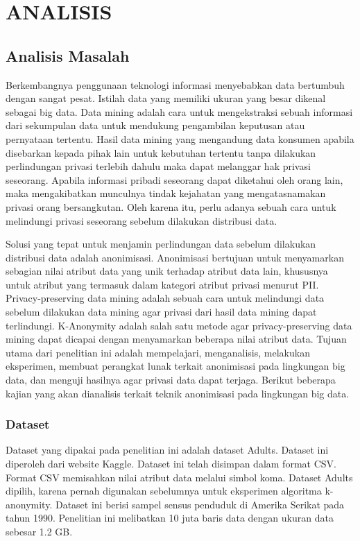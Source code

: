 \chapter{ANALISIS}
\section{Analisis Masalah}
Berkembangnya penggunaan teknologi informasi menyebabkan data bertumbuh dengan sangat pesat. Istilah data yang memiliki ukuran yang besar dikenal sebagai big data. Data mining adalah cara untuk mengekstraksi sebuah informasi dari sekumpulan data untuk mendukung pengambilan keputusan atau pernyataan tertentu. Hasil data mining yang mengandung data konsumen apabila disebarkan kepada pihak lain untuk kebutuhan tertentu tanpa dilakukan perlindungan privasi terlebih dahulu maka dapat melanggar hak privasi seseorang. Apabila informasi pribadi seseorang dapat diketahui oleh orang lain, maka mengakibatkan munculnya tindak kejahatan yang mengatasnamakan privasi orang bersangkutan. Oleh karena itu, perlu adanya sebuah cara untuk melindungi privasi seseorang sebelum dilakukan distribusi data.

\par Solusi yang tepat untuk menjamin perlindungan data sebelum dilakukan distribusi data adalah anonimisasi. Anonimisasi bertujuan untuk menyamarkan sebagian nilai atribut data yang unik terhadap atribut data lain, khususnya untuk atribut yang termasuk dalam kategori atribut privasi menurut PII. Privacy-preserving data mining adalah sebuah cara untuk melindungi data sebelum dilakukan data mining agar privasi dari hasil data mining dapat terlindungi. K-Anonymity adalah salah satu metode agar privacy-preserving data mining dapat dicapai dengan menyamarkan beberapa nilai atribut data. Tujuan utama dari penelitian ini adalah mempelajari, menganalisis, melakukan eksperimen, membuat perangkat lunak terkait anonimisasi pada lingkungan big data, dan menguji hasilnya agar privasi data dapat terjaga. Berikut beberapa kajian yang akan dianalisis terkait teknik anonimisasi pada lingkungan big data.

\subsection{Dataset}
Dataset yang dipakai pada penelitian ini adalah dataset Adults. Dataset ini diperoleh dari website Kaggle. Dataset ini telah disimpan dalam format CSV. Format CSV memisahkan nilai atribut data melalui simbol koma. Dataset Adults dipilih, karena pernah digunakan sebelumnya untuk eksperimen algoritma k-anonymity.  Dataset ini berisi sampel sensus penduduk di Amerika Serikat pada tahun 1990. Penelitian ini melibatkan 10 juta baris data dengan ukuran data sebesar 1.2 GB. 

